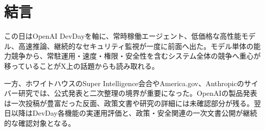 \section*{結言}
この日はOpenAI DevDayを軸に、常時稼働エージェント、低価格な高性能モデル、高速推論、継続的なセキュリティ監視が一度に前面へ出た。モデル単体の能力競争から、常駐運用・速度・権限・安全性を含むシステム全体の競争へ重心が移っていることがX上の話題からも読み取れる。

一方、ホワイトハウスのSuper Intelligence会合やAmerica.gov、Anthropicのサイバー研究では、公式発表と二次整理の境界が重要になった。OpenAIの製品発表は一次投稿が豊富だった反面、政策文書や研究の詳細には未確認部分が残る。翌日以降はDevDay各機能の実運用評価と、政策・安全関連の一次文書公開が継続的な確認対象となる。
